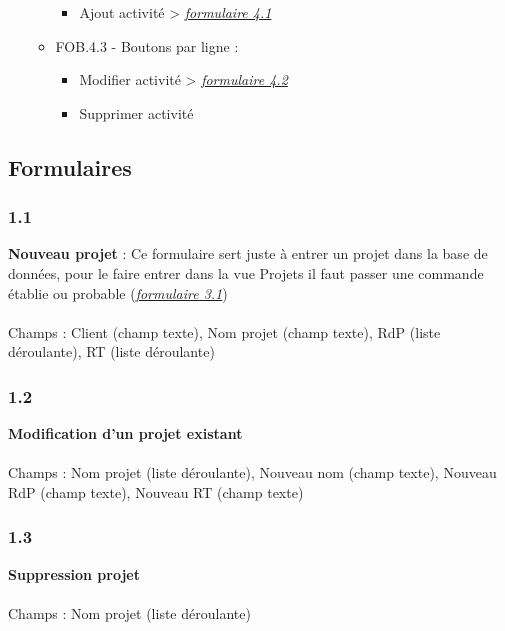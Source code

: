 \documentclass[french]{report}
\begin{document}
\begin{itemize}[label=\textbullet, font=\normalfont \color{blue}]
\begin{itemize}[label=\textbullet]
  \begin{itemize}[label=-]
    \item{Ajout activité} > \hyperref[sec:4.1]{\emph{formulaire 4.1}}
  \end{itemize}

  \item{FOB.4.3 - Boutons par ligne :}

  \begin{itemize}[label=-]
    \item{Modifier activité} > \hyperref[sec:4.2]{\emph{formulaire 4.2}}
    \item{Supprimer activité}

  \end{itemize}

\end{itemize}

\end{itemize}

\subsection{Formulaires}

\subsubsection{1.1}
\label{sec:1.1}
\textbf{Nouveau projet} : Ce formulaire sert juste à entrer un projet dans la base de
données, pour le faire entrer dans la vue Projets il faut passer une commande
établie ou probable (\hyperref[sec:3.1]{\emph{formulaire 3.1}})
\\\\ Champs : Client (champ texte), Nom projet (champ texte), RdP (liste
déroulante), RT (liste déroulante)

\subsubsection{1.2}
\label{sec:1.2}
\textbf{Modification d’un projet existant}\\\\ Champs : Nom projet (liste déroulante),
Nouveau nom (champ texte), Nouveau RdP (champ texte), Nouveau RT (champ texte)

\subsubsection{1.3}
\label{sec:1.3}
\textbf{Suppression projet}\\\\
Champs : Nom projet (liste déroulante)
\end{document}

